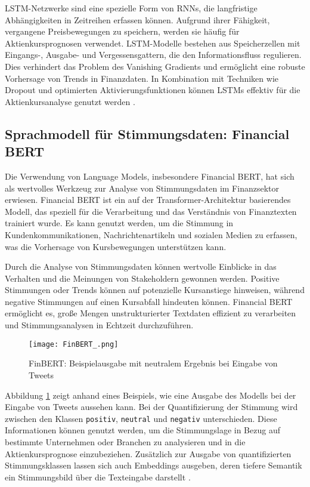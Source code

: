 \ac{LSTM}-Netzwerke sind eine spezielle Form von \acp{RNN}, die langfristige Abhängigkeiten in Zeitreihen erfassen können. Aufgrund ihrer Fähigkeit, vergangene Preisbewegungen zu speichern, werden sie häufig für Aktienkursprognosen verwendet. \ac{LSTM}-Modelle bestehen aus Speicherzellen mit Eingangs-, Ausgabe- und Vergessensgattern, die den Informationsfluss regulieren. Dies verhindert das Problem des Vanishing Gradients und ermöglicht eine robuste Vorhersage von Trends in Finanzdaten. In Kombination mit Techniken wie Dropout und optimierten Aktivierungsfunktionen können \acp{LSTM} effektiv für die Aktienkursanalyse genutzt werden \autocite{hochreiter1997long}\autocite{fischer2018deep}\autocite{siami2019performance}.


\subsection{Sprachmodell für Stimmungsdaten: Financial BERT}\label{sec:data_prep_finbert}

Die Verwendung von Language Models, insbesondere Financial BERT, hat sich als wertvolles Werkzeug zur Analyse von Stimmungsdaten im Finanzsektor erwiesen. Financial BERT ist ein auf der Transformer-Architektur basierendes Modell, das speziell für die Verarbeitung und das Verständnis von Finanztexten trainiert wurde. Es kann genutzt werden, um die Stimmung in Kundenkommunikationen, Nachrichtenartikeln und sozialen Medien zu erfassen, was die Vorhersage von Kursbewegungen unterstützen kann.

Durch die Analyse von Stimmungsdaten können wertvolle Einblicke in das Verhalten und die Meinungen von Stakeholdern gewonnen werden. Positive Stimmungen oder Trends können auf potenzielle Kursanstiege hinweisen, während negative Stimmungen auf einen Kursabfall hindeuten können. Financial BERT ermöglicht es, große Mengen unstrukturierter Textdaten effizient zu verarbeiten und Stimmungsanalysen in Echtzeit durchzuführen.

\begin{figure}[H]
	\centering
	\texttt{[image: FinBERT\_.png]}
	\caption{FinBERT: Beispielausgabe mit neutralem Ergebnis bei Eingabe von Tweets}
	\label{fig:finbert_architecture}
\end{figure}

Abbildung \ref{fig:finbert_architecture} zeigt anhand eines Beispiels, wie eine Ausgabe des Modells bei der Eingabe von Tweets aussehen kann. Bei der Quantifizierung der Stimmung wird zwischen den Klassen \texttt{positiv}, \texttt{neutral} und \texttt{negativ} unterschieden. Diese Informationen können genutzt werden, um die Stimmungslage in Bezug auf bestimmte Unternehmen oder Branchen zu analysieren und in die Aktienkursprognose einzubeziehen. Zusätzlich zur Ausgabe von quantifizierten Stimmungsklassen lassen sich auch Embeddings ausgeben, deren tiefere Semantik ein Stimmungsbild über die Texteingabe darstellt \autocite{devlin2019}\autocite{finbert2019}\autocite{yang2020}.

